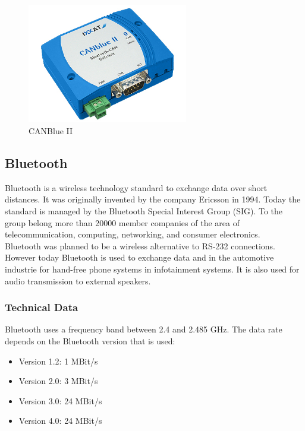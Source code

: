 \documentclass[11pt]{article}
\begin{document}
\begin{figure}[H]

 \centering
 \includegraphics [width=7cm]{interface-canblue-ii.jpg} %
 \caption{CANBlue II\cite{cite8}}
\end{figure}


\newpage

\subsection{Bluetooth}

Bluetooth is a wireless technology standard to exchange data over short distances. It was originally invented by the company Ericsson in 1994. Today the standard is managed by the Bluetooth Special Interest Group (SIG). To the group belong more than 20000 member companies of the area of telecommunication, computing, networking, and consumer electronics.\\
Bluetooth was planned to be a wireless alternative to RS-232 connections. However today Bluetooth is used to exchange data and in the automotive industrie for hand-free phone systems in infotainment systems. It is also used for audio transmission to external speakers.\cite{cite9}

\subsubsection{Technical Data}
Bluetooth uses a frequency band between 2.4 and 2.485 GHz. The data rate depends on the Bluetooth version that is used:

\begin{itemize} 
\item Version 1.2: 1 MBit/s
\item Version 2.0: 3 MBit/s
\item Version 3.0: 24 MBit/s
\item Version 4.0: 24 MBit/s 
\end{itemize}
\end{document}
